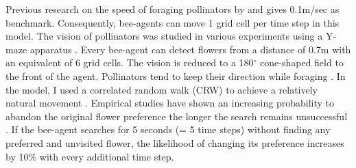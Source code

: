 Previous research on the speed of foraging pollinators by \cite{essenberg2012explaining} and \cite{kunin1991few} gives 0.1m/sec as benchmark. Consequently, bee-agents can move 1 grid cell per time step in this model. The vision of pollinators was studied in various experiments using a Y-maze apparatus \citep{dyer2008comparative, wertlen2008detection, ne2001effect}. Every bee-agent can detect flowers from a distance of 0.7m with an equivalent of 6 grid cells. The vision is reduced to a 180$^{\circ}$ cone-shaped field to the front of the agent. Pollinators tend to keep their direction while foraging \citep{waddington1980flight}. In the model, I used a correlated random walk (CRW) to achieve a relatively natural movement \citep{bartumeus2005animal, codling2008random,  pyke1992flight, viswanathan2008levy}. Empirical studies have shown an increasing probability to abandon the original flower preference the longer the search remains unsuccessful \citep{chittka1997foraging,kunin1993sex}. If the bee-agent searches for 5 seconds (= 5 time steps) without finding any preferred and unvisited flower, the likelihood of changing its preference increases by 10\% with every additional time step. \\

